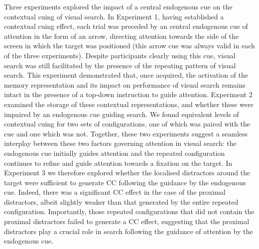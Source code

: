 \documentclass[
  man,
  floatsintext,
  longtable,
  nolmodern,
  notxfonts,
  notimes,
  colorlinks=true,linkcolor=blue,citecolor=blue,urlcolor=blue]{apa7}
\begin{document}
Three experiments explored the impact of a central endogenous cue on the
contextual cuing of visual search. In Experiment 1, having established a
contextual cuing effect, each trial was preceded by an central
endogenous cue of attention in the form of an arrow, directing attention
towards the side of the screen in which the target was positioned (this
arrow cue was always valid in each of the three experiments). Despite
participants clearly using this cue, visual search was still facilitated
by the presence of the repeating pattern of visual search. This
experiment demonstrated that, once acquired, the activation of the
memory representation and its impact on performance of visual search
remains intact in the presence of a top-down instruction to guide
attention. Experiment 2 examined the storage of these contextual
representations, and whether these were impaired by an endogenous cue
guiding search. We found equivalent levels of contextual cuing for two
sets of configurations, one of which was paired with the cue and one
which was not. Together, these two experiments suggest a seamless
interplay between these two factors governing attention in visual
search: the endogenous cue initially guides attention and the repeated
configuration continues to refine and guide attention towards a fixation
on the target. In Experiment 3 we therefore explored whether the
localised distractors around the target were sufficient to generate CC
following the guidance by the endogenous cue. Indeed, there was a
significant CC effect in the case of the proximal distractors, albeit
slightly weaker than that generated by the entire repeated
configuration. Importantly, those repeated configurations that did not
contain the proximal distractors failed to generate a CC effect,
suggesting that the proximal distractors play a crucial role in search
following the guidance of attention by the endogenous cue.
\end{document}
